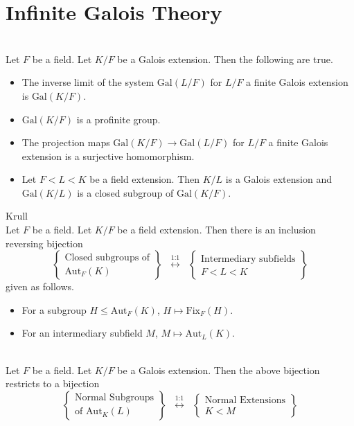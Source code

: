 \documentclass[a4paper]{article}
\begin{document}
\section{Infinite Galois Theory}
\begin{prp}{}{}\\
Let $F$ be a field. Let $K/F$ be a Galois extension. Then the following are true. 
\begin{itemize}
\item The inverse limit of the system $\text{Gal}(L/F)$ for $L/F$ a finite Galois extension is $\text{Gal}(K/F)$. 
\item $\text{Gal}(K/F)$ is a profinite group. 
\item The projection maps $\text{Gal}(K/F)\to\text{Gal}(L/F)$ for $L/F$ a finite Galois extension is a surjective homomorphism. 
\item Let $F<L<K$ be a field extension. Then $K/L$ is a Galois extension and $\text{Gal}(K/L)$ is a closed subgroup of $\text{Gal}(K/F)$. 
\end{itemize}
\end{prp}

\begin{thm}{Krull}{}\\
Let $F$ be a field. Let $K/F$ be a field extension. Then there is an inclusion reversing bijection $$\left\{\substack{\text{Closed subgroups of}\\\text{Aut}_F(K)}\right\}\;\;\overset{\text{1:1}}{\longleftrightarrow}\;\;\left\{\substack{\text{Intermediary subfields}\\ F<L<K}\right\}$$ given as follows. 
\begin{itemize}
\item For a subgroup $H\leq\text{Aut}_F(K)$, $H\mapsto\text{Fix}_F(H)$. 
\item For an intermediary subfield $M$, $M\mapsto\text{Aut}_L(K)$. 
\end{itemize}
\end{thm}

\begin{prp}{}{}\\
Let $F$ be a field. Let $K/F$ be a Galois extension. Then the above bijection restricts to a bijection $$\left\{\substack{\text{Normal Subgroups}\\\text{of }\text{Aut}_K(L)}\right\}\;\;\overset{\text{1:1}}{\longleftrightarrow}\;\;\left\{\substack{\text{Normal Extensions}\\ K<M}\right\}$$ 
\end{prp}
\end{document}
